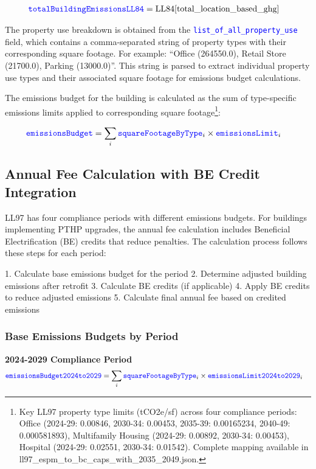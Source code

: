 \documentclass{article}
\newcommand{\code}[1]{\textcolor{blue}{\texttt{#1}}}
\begin{document}
\begin{align}
\code{totalBuildingEmissionsLL84} &= \text{LL84}[\text{total\_location\_based\_ghg}]
\end{align}

The property use breakdown is obtained from the \code{list\_of\_all\_property\_use} field, which contains a comma-separated string of property types with their corresponding square footage. For example: ``Office (264550.0), Retail Store (21700.0), Parking (13000.0)''. This string is parsed to extract individual property use types and their associated square footage for emissions budget calculations.

The emissions budget for the building is calculated as the sum of type-specific emissions limits applied to corresponding square footage\footnote{Key LL97 property type limits (tCO2e/sf) across four compliance periods: Office (2024-29: 0.00846, 2030-34: 0.00453, 2035-39: 0.00165234, 2040-49: 0.000581893), Multifamily Housing (2024-29: 0.00892, 2030-34: 0.00453), Hospital (2024-29: 0.02551, 2030-34: 0.01542). Complete mapping available in ll97\_espm\_to\_bc\_caps\_with\_2035\_2049.json.}:

\begin{align}
\code{emissionsBudget} &= \sum_{i} \code{squareFootageByType}_i \times \code{emissionsLimit}_i
\end{align}

\subsection{Annual Fee Calculation with BE Credit Integration}

LL97 has four compliance periods with different emissions budgets. For buildings implementing PTHP upgrades, the annual fee calculation includes Beneficial Electrification (BE) credits that reduce penalties. The calculation process follows these steps for each period:

1. Calculate base emissions budget for the period
2. Determine adjusted building emissions after retrofit
3. Calculate BE credits (if applicable)
4. Apply BE credits to reduce adjusted emissions
5. Calculate final annual fee based on credited emissions

\subsubsection{Base Emissions Budgets by Period}

\textbf{2024-2029 Compliance Period}
\begin{align}
\code{emissionsBudget2024to2029} &= \sum_{i} \code{squareFootageByType}_i \times \code{emissionsLimit2024to2029}_i
\end{align}
\end{document}
